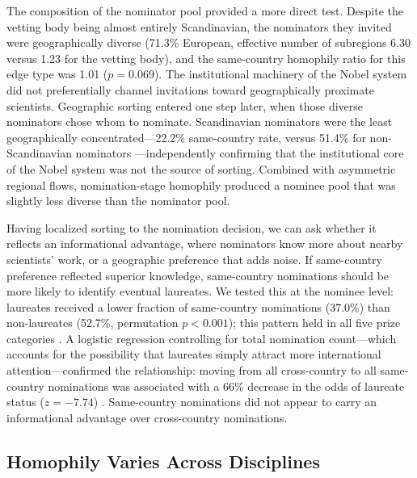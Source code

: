 \documentclass[12pt]{article}
\begin{document}
The composition of the nominator pool provided a more direct test. Despite the vetting body being almost entirely Scandinavian, the nominators they invited were geographically diverse (71.3\% European, effective number of subregions 6.30 versus 1.23 for the vetting body), and the same-country homophily ratio for this edge type was 1.01 ($p = 0.069$). The institutional machinery of the Nobel system did not preferentially channel invitations toward geographically proximate scientists. Geographic sorting entered one step later, when those diverse nominators chose whom to nominate. Scandinavian nominators were the least geographically concentrated---22.2\% same-country rate, versus 51.4\% for non-Scandinavian nominators \cite{methods}---independently confirming that the institutional core of the Nobel system was not the source of sorting. Combined with asymmetric regional flows, nomination-stage homophily produced a nominee pool that was slightly less diverse than the nominator pool.

Having localized sorting to the nomination decision, we can ask whether it reflects an informational advantage, where nominators know more about nearby scientists' work, or a geographic preference that adds noise. If same-country preference reflected superior knowledge, same-country nominations should be more likely to identify eventual laureates. We tested this at the nominee level: laureates received a lower fraction of same-country nominations (37.0\%) than non-laureates (52.7\%, permutation $p < 0.001$); this pattern held in all five prize categories \cite{methods}. A logistic regression controlling for total nomination count---which accounts for the possibility that laureates simply attract more international attention---confirmed the relationship: moving from all cross-country to all same-country nominations was associated with a 66\% decrease in the odds of laureate status ($z = -7.74$) \cite{methods}. Same-country nominations did not appear to carry an informational advantage over cross-country nominations.

\subsection*{Homophily Varies Across Disciplines}
\end{document}
